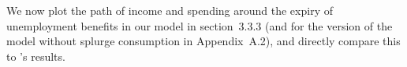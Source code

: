 \begin{itemize}
      We now plot the path of income and spending around the expiry of unemployment benefits in our model in section~3.3.3 (and for the version of the model without splurge consumption in Appendix~A.2), and directly compare this to \citeauthor{ganongConsumer2019}'s results.
	
	
\end{itemize}
